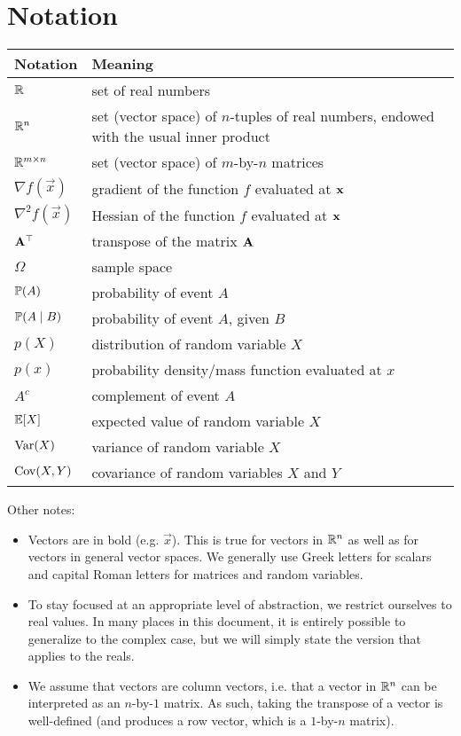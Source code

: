 \documentclass{article}
\begin{document}
\section{Notation}
\begin{tabular}{|l|l|}
\hline
Notation & Meaning \\
\hline
$\mathbb{R}$ & set of real numbers \\
$\mathbb{R}^n$ & set (vector space) of $n$-tuples of real numbers, endowed with the usual inner product \\
$\mathbb{R}^{m \times n}$ & set (vector space) of $m$-by-$n$ matrices \\
$\nabla f(\vec{x})$ & gradient of the function $f$ evaluated at $\mathbf{x}$ \\
$\nabla^2 f(\vec{x})$ & Hessian of the function $f$ evaluated at $\mathbf{x}$ \\
$\mathbf{A}^\top$ & transpose of the matrix $\mathbf{A}$ \\
$\Omega$ & sample space \\
$\mathbb{P}(A)$ & probability of event $A$ \\
$\mathbb{P}(A \mid B)$ & probability of event $A$, given $B$ \\
$p(X)$ & distribution of random variable $X$ \\
$p(x)$ & probability density/mass function evaluated at $x$ \\
$A^c$ & complement of event $A$ \\
$\mathbb{E}[X]$ & expected value of random variable $X$ \\
$\operatorname{Var}(X)$ & variance of random variable $X$ \\
$\operatorname{Cov}(X, Y)$ & covariance of random variables $X$ and $Y$ \\
\hline
\end{tabular}

\vspace{0.5cm}
Other notes:
\begin{itemize}
\item Vectors are in bold (e.g. $\vec{x}$).
This is true for vectors in $\mathbb{R}^n$ as well as for vectors in general vector spaces.
We generally use Greek letters for scalars and capital Roman letters for matrices and random variables.

\item To stay focused at an appropriate level of abstraction, we restrict ourselves to real values.
In many places in this document, it is entirely possible to generalize to the complex case, but we will simply state the version that applies to the reals.

\item We assume that vectors are column vectors, i.e. that a vector in $\mathbb{R}^n$ can be interpreted as an $n$-by-$1$ matrix.
As such, taking the transpose of a vector is well-defined (and produces a row vector, which is a $1$-by-$n$ matrix).
\end{itemize}
\end{document}
